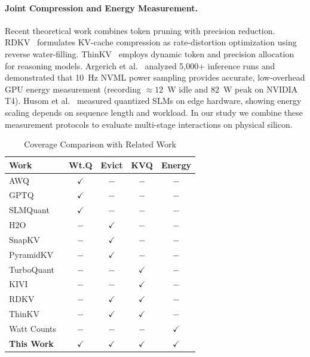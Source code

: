 \documentclass[sigconf,nonacm]{acmart}
\newcommand{\cmark}{\ensuremath{\checkmark}}
\newcommand{\xmark}{\ensuremath{-}}
\begin{document}
\paragraph{Joint Compression and Energy Measurement.}
Recent theoretical work combines token pruning with precision reduction. RDKV~\cite{zhang_rdkv_2026} formulates KV-cache compression as rate-distortion optimization using reverse water-filling. ThinKV~\cite{ramachandran_thinkv_2026} employs dynamic token and precision allocation for reasoning models. Argerich et al.~\cite{argerich_watt_2026} analyzed 5,000+ inference runs and demonstrated that 10~Hz NVML power sampling provides accurate, low-overhead GPU energy measurement (recording $\approx 12$~W idle and 82~W peak on NVIDIA T4). Husom et al.~\cite{husom_sustainable_2025} measured quantized SLMs on edge hardware, showing energy scaling depends on sequence length and workload. In our study we combine these measurement protocols to evaluate multi-stage interactions on physical silicon.

\begin{table}[t]
\caption{Coverage Comparison with Related Work}
\label{tab:comparison}
\centering\small
\setlength{\tabcolsep}{5pt}
\begin{tabular}{@{}lcccc@{}}
\toprule
\textbf{Work} & \textbf{Wt.Q} & \textbf{Evict} & \textbf{KVQ} & \textbf{Energy} \\
\midrule
AWQ~\cite{lin_awq_2025}            & \cmark & \xmark & \xmark & \xmark \\
GPTQ~\cite{frantar_gptq_2023}      & \cmark & \xmark & \xmark & \xmark \\
SLMQuant~\cite{wang_slmquant_2025} & \cmark & \xmark & \xmark & \xmark \\
H2O~\cite{zhang_h2o_2023}          & \xmark & \cmark & \xmark & \xmark \\
SnapKV~\cite{li_snapkv_2024}       & \xmark & \cmark & \xmark & \xmark \\
PyramidKV~\cite{cai_pyramidkv_2025}& \xmark & \cmark & \xmark & \xmark \\
TurboQuant~\cite{zandieh2026turboquant} & \xmark & \xmark & \cmark & \xmark \\
KIVI~\cite{liu_kivi_2023}          & \xmark & \xmark & \cmark & \xmark \\
RDKV~\cite{zhang_rdkv_2026}        & \xmark & \cmark & \cmark & \xmark \\
ThinKV~\cite{ramachandran_thinkv_2026} & \xmark & \cmark & \cmark & \xmark \\
Watt Counts~\cite{argerich_watt_2026} & \xmark & \xmark & \xmark & \cmark \\
\midrule
\textbf{This Work}                 & \textbf{\cmark} & \textbf{\cmark} & \textbf{\cmark} & \textbf{\cmark} \\
\bottomrule
\end{tabular}
\end{table}
\end{document}
